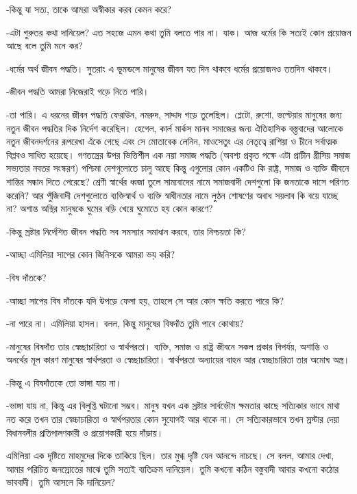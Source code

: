 \documentclass[
]{book}
\begin{document}
-কিন্তু যা সত্য, তাকে আমরা অস্বীকার করব কেমন করে?

-এটা গুরুতর কথা দানিয়েল? এত সহজে এমন কথা তুমি বলতে পার না। যাক। আজ ধর্মের কি সত্যই কোন প্রয়োজন আছে বলে তুমি মনে কর?

-ধর্মের অর্থ জীবন পদ্ধতি। সুতরাং এ ভূমন্ডলে মানুষের জীবন যত দিন থাকবে ধর্মের প্রয়োজনও ততদিন থাকবে।

-জীবন পদ্ধতি আমরা নিজেরাই গড়ে নিতে পারি।

-তা পারি। এ ধরনের জীবন পদ্ধতি ফেরাউন, নমরুদ, সাদ্দাদ গড়ে তুলেছিল। প্লেটো, রুশো, ভল্টেয়ার মানুষের জন্য নতুন জীবন পদ্ধতির দিক নির্দেশ করেছিল। হেগেল, কার্ল মার্কস মানব সমাজের জন্য ঐতিহাসিক বস্ত্তবাদের আলোকে নতুন জীবনদর্শনের রূপরেখা এঁকে গেছে এবং সে মোতাবেক লেনিন, মাওসেতুং এর নেতৃত্বে রাশিয়া ও চীনে সর্বাত্মক বিপ্লবও সাধিত হয়েছে। গণতন্ত্রের উপর ভিত্তিশীল এক নয়া সমাজ পদ্ধতি (অবশ্য প্রকৃত পক্ষে এটা প্রাচীন গ্রীসিয় সমাজ সভ্যতার নবতর সংস্করণ) পশ্চিমা দেশগুলোতে চালু আছে কিন্তু এগুলোর কোন একটিও কি রাষ্ট্র, সমাজ ও ব্যক্তি জীবনে শান্তির সন্ধান দিতে পেরেছে? শ্রেণী স্বার্থের ধ্বজা তুলে সাম্যবাদের নামে সমাজবাদী দেশগুলো কি জনতাকে দাসে পরিণত করেনি? আর পুঁজিবাদী দেশগুলোতে ব্যক্তিস্বার্থ ও ব্যক্তি স্বাধীনতার নামে লুণ্ঠন শোষণের অবাধ সয়লাব কি বয়ে যাচ্ছে না? অশান্ত অস্থির মানুষকে ঘুমের বড়ি খেয়ে ঘুমোতে হয় কোন কারণে?

-কিন্তু স্রষ্টার নির্দেশিত জীবন পদ্ধতি সব সমস্যার সমাধান করবে, তার নিশ্চয়তা কি?

-আচ্ছা এমিলিয়া সাপের কোন জিনিসকে আমরা ভয় করি?

-বিষ দাঁতকে?

-আচ্ছা সাপের বিষ দাঁতকে যদি উপড়ে ফেলা হয়, তাহলে সে আর কোন ক্ষতি করতে পারে কি?

-না পারে না। এমিলিয়া হাসল। বলল, কিন্তু মানুষের বিষদাঁত তুমি পাবে কোথায়?

-মানুষের বিষদাঁত তার স্বেচ্ছাচারিতা ও স্বার্থপরতা। ব্যক্তি, সমাজ ও রাষ্ট্র জীবনে সকল প্রকার বিপর্যয়, অশান্তি ও অনর্থের মূল কারণ মানুষের স্বার্থপরতা ও স্বেচ্ছাচারিতা। স্বার্থপরতা অন্যায়ের বাহন আর স্বেচ্ছাচারিতা তার অমোঘ অস্ত্র।

-কিন্তু এ বিষদাঁতকে তো ভাঙ্গা যায় না।

-ভাঙ্গা যায় না, কিন্তু এর বিলুপ্তি ঘটানো সম্ভব। মানুষ যখন এক স্রষ্টার সার্বভৌম ক্ষমতার কাছে সত্যিকার ভাবে মাথা নত করে তখন তার স্বেচ্চাচারিতা ও স্বার্থপরতার কোন সুযোগই আর থাকে না। সে সত্যিকারভাবে তখন স্রস্টার দেয়া বিধানবলীর প্রতিপালণকারী ও প্রয়োগকারী হয়ে দাঁড়ায়।

এমিলিয়া এক দৃষ্টিতে মাহমুদের দিকে তাকিয়ে ছিল। তার মুগ্ধ দৃষ্টি যেন আনন্দে নাচছে। সে বলল, আমার দেখা, আমার পরিচিত জনস্রোতের মাঝে তুমি সত্যই ব্যতিক্রম দানিয়েল। তুমি কখনো কঠিন বস্তুবাদী আবার কখনো কঠোর ভাববাদী। তুমি আসলে কি দানিয়েল?
\end{document}
